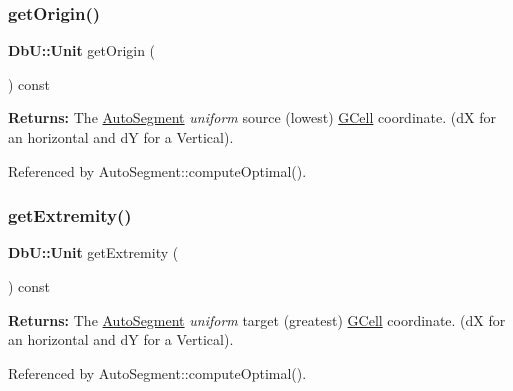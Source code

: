 \mbox{\label{classKatabatic_1_1AutoSegment_ab5fb22520af4b94f2ae984304fa64c26}} 
\subsubsection{\texorpdfstring{get\+Origin()}{getOrigin()}}
{\footnotesize\ttfamily \textbf{ Db\+U\+::\+Unit} get\+Origin (\begin{DoxyParamCaption}{ }\end{DoxyParamCaption}) const\hspace{0.3cm}{\ttfamily [inline]}}

{\bfseries Returns\+:} The \hyperlink{classKatabatic_1_1AutoSegment}{Auto\+Segment} {\itshape uniform} source (lowest) \hyperlink{classKatabatic_1_1GCell}{G\+Cell} coordinate. (dX for an horizontal and dY for a Vertical). 

Referenced by Auto\+Segment\+::compute\+Optimal().

\mbox{\label{classKatabatic_1_1AutoSegment_a5b81aad92361558c3b9e60fd501b89ba}} 
\subsubsection{\texorpdfstring{get\+Extremity()}{getExtremity()}}
{\footnotesize\ttfamily \textbf{ Db\+U\+::\+Unit} get\+Extremity (\begin{DoxyParamCaption}{ }\end{DoxyParamCaption}) const\hspace{0.3cm}{\ttfamily [inline]}}

{\bfseries Returns\+:} The \hyperlink{classKatabatic_1_1AutoSegment}{Auto\+Segment} {\itshape uniform} target (greatest) \hyperlink{classKatabatic_1_1GCell}{G\+Cell} coordinate. (dX for an horizontal and dY for a Vertical). 

Referenced by Auto\+Segment\+::compute\+Optimal().

\mbox{\label{classKatabatic_1_1AutoSegment_a248eb2fbb06e3286650b28567d495f0b}} 
